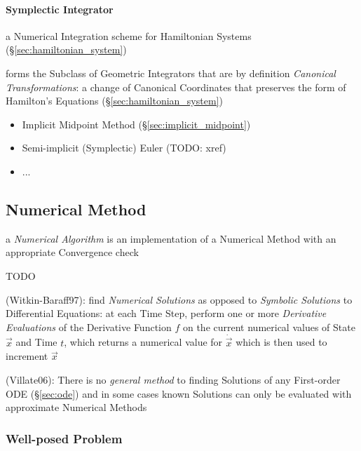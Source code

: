 \paragraph{Symplectic Integrator}\label{sec:symplectic_integrator}\hfill

a Numerical Integration scheme for Hamiltonian Systems
(\S\ref{sec:hamiltonian_system})

forms the Subclass of Geometric Integrators that are by definition
\emph{Canonical Transformations}: a change of Canonical Coordinates that
preserves the form of Hamilton's Equations (\S\ref{sec:hamiltonian_system})

\begin{itemize}
  \item Implicit Midpoint Method (\S\ref{sec:implicit_midpoint})
  \item Semi-implicit (Symplectic) Euler (TODO: xref)
  \item ...
\end{itemize}



\subsection{Numerical Method}\label{sec:numerical_method}

a \emph{Numerical Algorithm} is an implementation of a Numerical Method with an
appropriate Convergence check

TODO

(Witkin-Baraff97): find \emph{Numerical Solutions} as opposed to \emph{Symbolic
  Solutions} to Differential Equations: at each Time Step, perform one or more
\emph{Derivative Evaluations} of the Derivative Function $f$ on the current
numerical values of State $\vec{x}$ and Time $t$, which returns a numerical
value for $\dot{\vec{x}}$ which is then used to increment $\vec{x}$

(Villate06): There is no \emph{general method} to finding Solutions of any
First-order ODE (\S\ref{sec:ode}) and in some cases known Solutions can only be
evaluated with approximate Numerical Methods



\subsubsection{Well-posed Problem}\label{sec:well_posed}

